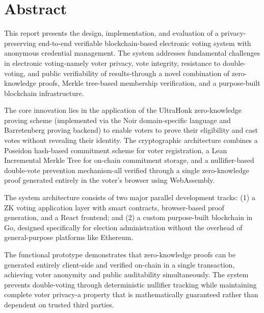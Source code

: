 \documentclass[12pt, a4paper]{report}
\begin{document}


\renewcommand{\thepage}{\roman{page}}

\chapter*{Abstract}

This report presents the design, implementation, and evaluation of a privacy-preserving end-to-end verifiable blockchain-based electronic voting system with anonymous credential management. The system addresses fundamental challenges in electronic voting-namely voter privacy, vote integrity, resistance to double-voting, and public verifiability of results-through a novel combination of zero-knowledge proofs, Merkle tree-based membership verification, and a purpose-built blockchain infrastructure.

The core innovation lies in the application of the UltraHonk zero-knowledge proving scheme (implemented via the Noir domain-specific language and Barretenberg proving backend) to enable voters to prove their eligibility and cast votes without revealing their identity. The cryptographic architecture combines a Poseidon hash-based commitment scheme for voter registration, a Lean Incremental Merkle Tree for on-chain commitment storage, and a nullifier-based double-vote prevention mechanism-all verified through a single zero-knowledge proof generated entirely in the voter's browser using WebAssembly.

The system architecture consists of two major parallel development tracks: (1) a ZK voting application layer with smart contracts, browser-based proof generation, and a React frontend; and (2) a custom purpose-built blockchain in Go, designed specifically for election administration without the overhead of general-purpose platforms like Ethereum.

The functional prototype demonstrates that zero-knowledge proofs can be generated entirely client-side and verified on-chain in a single transaction, achieving voter anonymity and public auditability simultaneously. The system prevents double-voting through deterministic nullifier tracking while maintaining complete voter privacy-a property that is mathematically guaranteed rather than dependent on trusted third parties.

\newpage

\tableofcontents
\newpage

\listoffigures
\newpage
\end{document}
